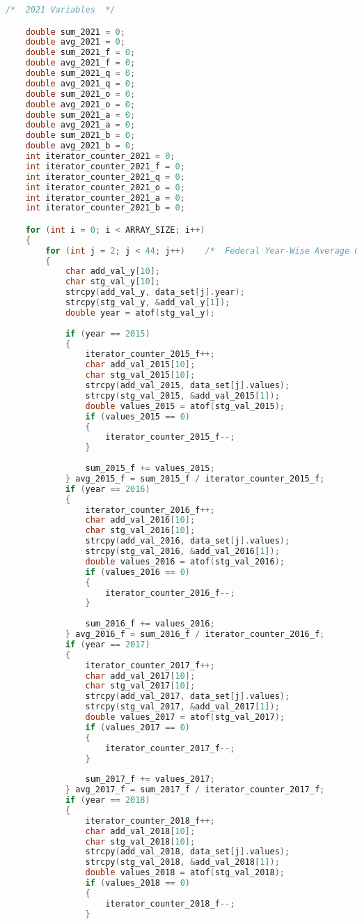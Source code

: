 \begin{lstlisting}[language=C, caption=\textit{CPS 188 Term Project Source Code}]
	/*	2021 Variables	*/

	double sum_2021 = 0;
	double avg_2021 = 0;
	double sum_2021_f = 0;
	double avg_2021_f = 0;
	double sum_2021_q = 0;
	double avg_2021_q = 0;
	double sum_2021_o = 0;
	double avg_2021_o = 0;
	double sum_2021_a = 0;
	double avg_2021_a = 0;
	double sum_2021_b = 0;
	double avg_2021_b = 0;
	int iterator_counter_2021 = 0;
	int iterator_counter_2021_f = 0;
	int iterator_counter_2021_q = 0;
	int iterator_counter_2021_o = 0;
	int iterator_counter_2021_a = 0;
	int iterator_counter_2021_b = 0;

    for (int i = 0; i < ARRAY_SIZE; i++)
    {
		for (int j = 2; j < 44; j++)	/*	Federal Year-Wise Average Calculator	*/
		{
			char add_val_y[10];
			char stg_val_y[10];
			strcpy(add_val_y, data_set[j].year);
			strcpy(stg_val_y, &add_val_y[1]);
			double year = atof(stg_val_y);
			
			if (year == 2015)
			{
				iterator_counter_2015_f++;
				char add_val_2015[10];
				char stg_val_2015[10];
				strcpy(add_val_2015, data_set[j].values);
				strcpy(stg_val_2015, &add_val_2015[1]);
				double values_2015 = atof(stg_val_2015);
				if (values_2015 == 0)
				{
					iterator_counter_2015_f--;
				}
				
				sum_2015_f += values_2015;
			} avg_2015_f = sum_2015_f / iterator_counter_2015_f;
			if (year == 2016)
			{
				iterator_counter_2016_f++;
				char add_val_2016[10];
				char stg_val_2016[10];
				strcpy(add_val_2016, data_set[j].values);
				strcpy(stg_val_2016, &add_val_2016[1]);
				double values_2016 = atof(stg_val_2016);
				if (values_2016 == 0)
				{
					iterator_counter_2016_f--;
				}
				
				sum_2016_f += values_2016;
			} avg_2016_f = sum_2016_f / iterator_counter_2016_f;
			if (year == 2017)
			{
				iterator_counter_2017_f++;
				char add_val_2017[10];
				char stg_val_2017[10];
				strcpy(add_val_2017, data_set[j].values);
				strcpy(stg_val_2017, &add_val_2017[1]);
				double values_2017 = atof(stg_val_2017);
				if (values_2017 == 0)
				{
					iterator_counter_2017_f--;
				}
				
				sum_2017_f += values_2017;
			} avg_2017_f = sum_2017_f / iterator_counter_2017_f;
			if (year == 2018)
			{
				iterator_counter_2018_f++;
				char add_val_2018[10];
				char stg_val_2018[10];
				strcpy(add_val_2018, data_set[j].values);
				strcpy(stg_val_2018, &add_val_2018[1]);
				double values_2018 = atof(stg_val_2018);
				if (values_2018 == 0)
				{
					iterator_counter_2018_f--;
				}
				

\end{lstlisting}
